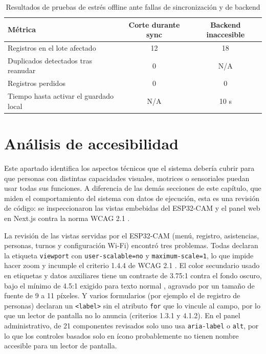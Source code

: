 \documentclass{iccmemoria}
\begin{document}
\begin{table}[H]
\centering
\small
\begin{tabular}{|l|c|c|}
\hline
\textbf{Métrica} & \textbf{Corte durante sync} & \textbf{Backend inaccesible} \\
\hline
Registros en el lote afectado & 12 & 18 \\
Duplicados detectados tras reanudar & 0 & N/A \\
Registros perdidos & 0 & 0 \\
Tiempo hasta activar el guardado local & N/A & 10 s \\
\hline
\end{tabular}
\caption{Resultados de pruebas de estrés offline ante fallas de sincronización y de backend}
\label{tab:estres_offline_fallas}
\end{table}

\section{Análisis de accesibilidad}
Este apartado identifica los aspectos técnicos que el sistema debería cubrir para que personas con distintas capacidades visuales, motrices o sensoriales puedan usar todas sus funciones. A diferencia de las demás secciones de este capítulo, que miden el comportamiento del sistema con datos de ejecución, esta es una revisión de código: se inspeccionaron las vistas embebidas del ESP32-CAM y el panel web en Next.js contra la norma WCAG 2.1 \cite{w3c_wcag21}.

La revisión de las vistas servidas por el ESP32-CAM (menú, registro, asistencias, personas, turnos y configuración Wi-Fi) encontró tres problemas. Todas declaran la etiqueta \texttt{viewport} con \texttt{user-scalable=no} y \texttt{maximum-scale=1}, lo que impide hacer zoom y incumple el criterio 1.4.4 de WCAG 2.1 \cite{w3c_wcag21}. El color secundario usado en etiquetas y datos auxiliares tiene un contraste de 3.75:1 contra el fondo oscuro, bajo el mínimo de 4.5:1 exigido para texto normal \cite{w3c_wcag21}, agravado por un tamaño de fuente de 9 a 11 píxeles. Y varios formularios (por ejemplo el de registro de personas) declaran un \texttt{<label>} sin el atributo \texttt{for} que lo vincule al campo, por lo que un lector de pantalla no lo anuncia (criterios 1.3.1 y 4.1.2). En el panel administrativo, de 21 componentes revisados solo uno usa \texttt{aria-label} o \texttt{alt}, por lo que los controles basados solo en ícono probablemente no tienen nombre accesible para un lector de pantalla.
\end{document}
